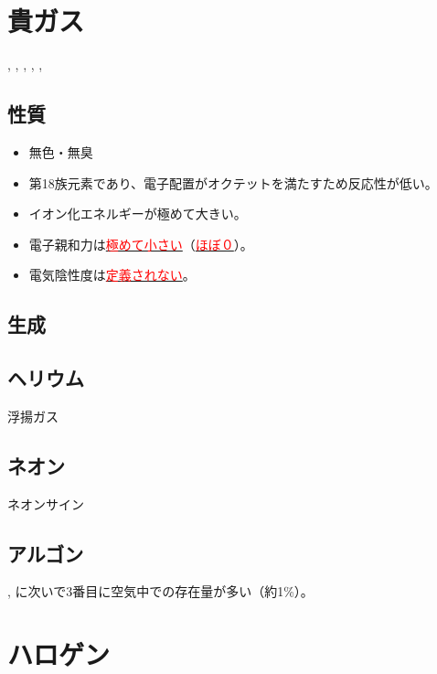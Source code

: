 \documentclass[dvipdfmx,a4paper,twocolumn]{jsarticle}
\newcommand{\hl}[1]{\underline{\textcolor{red}{\gtfamily #1}}}
\begin{document}
 \section{貴ガス}
 \hl{}, \hl{}, \hl{}, \hl{}, , 
  \subsection{性質}
  \begin{itemize}
   \item 無色・無臭
   \item 第18族元素であり、電子配置がオクテットを満たすため反応性が低い。
   \item イオン化エネルギーが極めて大きい。
   \item 電子親和力は\hl{極めて小さい}（\hl{ほぼ０}）。
   \item 電気陰性度は\hl{定義されない}。
  \end{itemize}
  \subsection{生成}
  \subsection{ヘリウム }
  浮揚ガス
  \subsection{ネオン }
  ネオンサイン
  \subsection{アルゴン }
  , に次いで3番目に空気中での存在量が多い（約1\%）。
 \section{ハロゲン}
\end{document}
